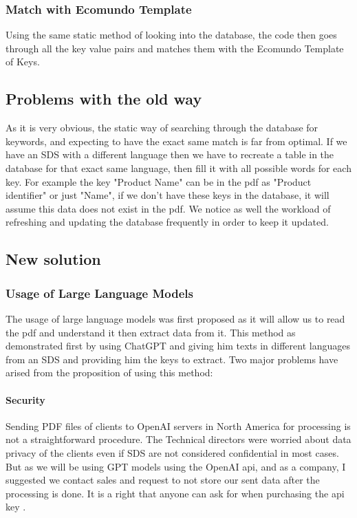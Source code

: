 \documentclass[a4paper,12pt,twoside]{report}
\begin{document}
\subsubsection{Match with Ecomundo Template}
Using the same static method of looking into the database, the code then goes through all the key value pairs and matches them with the Ecomundo Template of Keys. 
\subsection{Problems with the old way}
As it is very obvious, the static way of searching through the database for keywords, and expecting to have the exact same match is far from optimal. If we have an SDS with a different language then we have to recreate a table in the database for that exact same language, then fill it with all possible words for each key. For example the key "Product Name" can be in the pdf as "Product identifier" or just "Name", if we don't have these keys in the database, it will assume this data does not exist in the pdf.
We notice as well the workload of refreshing and updating the database frequently in order to keep it updated.
\subsection{New solution}
\subsubsection{Usage of Large Language Models}
The usage of large language models was first proposed as it will allow us to read the pdf and understand it then extract data from it. This method as demonstrated first by using ChatGPT and giving him texts in different languages from an SDS and providing him the keys to extract. Two major problems have arised from the proposition of using this method:
\paragraph{Security}
Sending PDF files of clients to OpenAI servers in North America for processing is not a straightforward procedure. The Technical directors were worried about data privacy of the clients even if SDS are not considered confidential in most cases. But as we will be using GPT models using the OpenAI api, and as a company, I suggested we contact sales and request to not store our sent data after the processing is done. It is a right that anyone can ask for when purchasing the api key \cite{openaiUP}.
\end{document}
